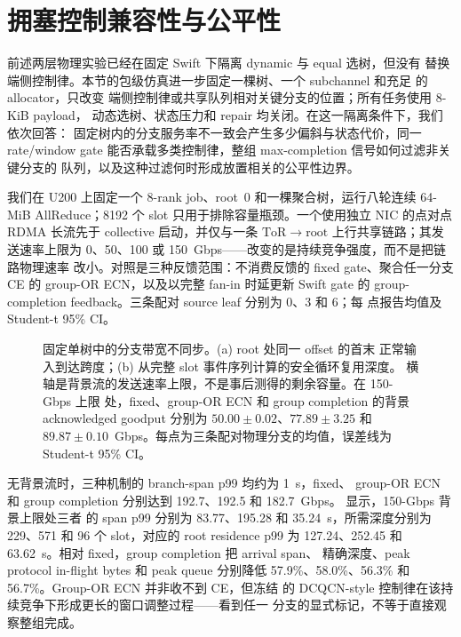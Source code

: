 \section{拥塞控制兼容性与公平性}
\label{ssec:eval-cc}

前述两层物理实验已经在固定 Swift 下隔离 dynamic 与 equal 选树，但没有
替换端侧控制律。本节的包级仿真进一步固定一棵树、一个 subchannel 和充足
的 allocator，只改变
端侧控制律或共享队列相对关键分支的位置；所有任务使用 8-KiB payload，
动态选树、状态压力和 repair 均关闭。在这一隔离条件下，我们依次回答：
固定树内的分支服务率不一致会产生多少偏斜与状态代价，同一 rate/window
gate 能否承载多类控制律，整组 max-completion 信号如何过滤非关键分支的
队列，以及这种过滤何时形成放置相关的公平性边界。

我们在 U200 上固定一个 8-rank job、root~0 和一棵聚合树，运行八轮连续
64-MiB AllReduce；8192 个 slot 只用于排除容量瓶颈。一个使用独立 NIC
的点对点 RDMA 长流先于 collective 启动，并仅与一条
$\mathrm{ToR}\rightarrow\mathrm{root}$ 上行共享链路；其发送速率上限为
0、50、100 或 150~Gbps——改变的是持续竞争强度，而不是把链路物理速率
改小。对照是三种反馈范围：不消费反馈的 fixed gate、聚合任一分支 CE 的
group-OR ECN，以及以完整 fan-in 时延更新 Swift gate 的
group-completion feedback。三条配对 source leaf 分别为 0、3 和 6；每
点报告均值及 Student-t 95\% CI。

\begin{figure}[t]
\centering

\caption{固定单树中的分支带宽不同步。(a) root 处同一 offset 的首末
正常输入到达跨度；(b) 从完整 slot 事件序列计算的安全循环复用深度。
横轴是背景流的发送速率上限，不是事后测得的剩余容量。在 150-Gbps 上限
处，fixed、group-OR ECN 和 group completion 的背景 acknowledged
goodput 分别为 $50.00\pm0.02$、$77.89\pm3.25$ 和
$89.87\pm0.10$~Gbps。每点为三条配对物理分支的均值，误差线为
Student-t 95\% CI。}
\label{fig:cc-branch-skew}
\end{figure}

无背景流时，三种机制的 branch-span p99 均约为 1~\textmu s，fixed、
group-OR ECN 和 group completion 分别达到 192.7、192.5 和
182.7~Gbps。 显示，150-Gbps 背景上限处三者
的 span p99 分别为 83.77、195.28 和 35.24~\textmu s，所需深度分别为
229、571 和 96 个 slot，对应的 root residence p99 为 127.24、252.45
和 63.62~\textmu s。相对 fixed，group completion 把 arrival span、
精确深度、peak protocol in-flight bytes 和 peak queue 分别降低
57.9\%、58.0\%、56.3\% 和 56.7\%。Group-OR ECN 并非收不到 CE，但冻结
的 DCQCN-style 控制律在该持续竞争下形成更长的窗口调整过程——看到任一
分支的显式标记，不等于直接观察整组完成。


